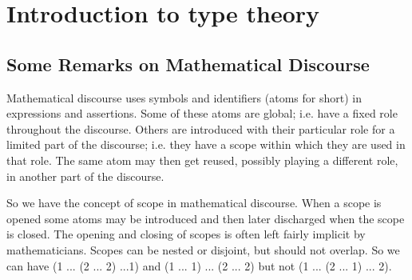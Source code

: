 \chapter{Introduction to type theory}
\label{cha:introduction}


{%


\newcommand{\stype}{{\;\sf type}}
\newcommand{\nat}{{\bf N}}
\newcommand{\rec}{{\sf rec}}
\newcommand{\bool}{{\bf B}}
\newcommand{\app}{{\sf app}}
\newcommand{\pair}{{\sf pair}}
\newcommand{\suc}{{\sf succ}}
\newcommand{\inleft}{{\sf inleft}}
\newcommand{\inright}{{\sf inright}}
\newcommand{\emptyt}{{\bf 0}}
\newcommand{\unitt}{{\bf 1}}
\section*{Some Remarks on Mathematical Discourse}

Mathematical discourse uses symbols and identifiers (atoms for short) in expressions and assertions.  Some of these atoms are global; i.e. have a fixed role throughout the discourse.  Others are introduced with their particular role for a limited part of the discourse; i.e. they have a scope within which they are used in that role.  The same atom may then get reused, possibly playing a different role, in another part of the discourse.  

So we have the concept of scope in mathematical discourse.  When a scope is opened some atoms may be introduced and then later discharged when the scope is closed.  The opening and closing of scopes is often left fairly implicit by mathematicians.  Scopes can be nested or disjoint, but should not overlap.  So we can have (1 ... (2 ... 2) ...1) and (1 ... 1) ... (2 ... 2) but not 
(1 ... (2 ... 1) ... 2).  

}
